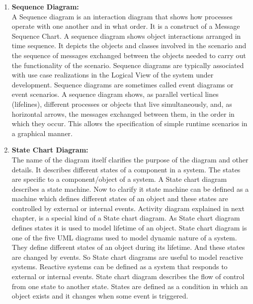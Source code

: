 \documentclass[12pt]{extreport}
\begin{document}
\begin{enumerate}
\noindent
\item \textbf{Sequence Diagram:}\\
A Sequence diagram is an interaction diagram that shows how processes operate with
one another and in what order. It is a construct of a Message Sequence Chart. A sequence
diagram shows object interactions arranged in time sequence. It depicts the objects
and classes involved in the scenario and the sequence of messages exchanged between
the objects needed to carry out the functionality of the scenario. Sequence diagrams
are typically associated with use case realizations in the
Logical View of the system under development. Sequence diagrams are sometimes called
event diagrams or event scenarios.
A sequence diagram shows, as parallel vertical lines (lifelines), different processes
or objects that live simultaneously, and, as horizontal arrows, the messages exchanged between them, in the order in which they occur. This allows the specification of simple runtime scenarios in a graphical manner.

\item \textbf{State Chart Diagram:}\\
The name of the diagram itself clarifies the purpose of the diagram and other details. It describes different states of a component in a system. The states are specific to a component/object of a system. A State chart diagram describes a state machine. Now to clarify it state machine can be defined as a machine which defines different states of an object and these states are controlled by external or internal events. Activity diagram explained in next chapter, is a special kind of a State chart diagram. As State chart diagram defines states it is used to model lifetime of an object. State chart diagram is one of the five UML diagrams used to model dynamic nature of a system. They define different states of an object during its lifetime. And these states are changed by events. So State chart diagrams are useful to model reactive systems. Reactive systems can be defined as a system that responds to external or internal events. State chart diagram describes the flow of control from one state to another state. States are defined as a condition in which an object exists and it changes when some event is triggered.


\end{enumerate}
\end{document}
